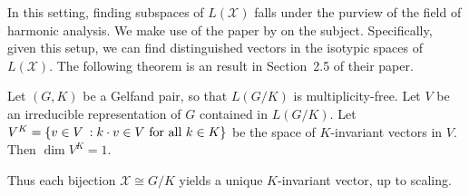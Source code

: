 \documentclass[cclicense]{hmcthesis}
\providecommand*{\xs}{\mathcal X}
\newcommand*{\STB}{\::}
\numberwithin{equation}{chapter}
\numberwithin{thmcounter}{chapter}
\begin{document}
    In this setting, finding subspaces of $L(\xs)$ falls under the purview of
    the field of harmonic analysis.  We make use of the paper by \citet{Harm} on
    the subject.  Specifically, given this setup, we can find distinguished
    vectors in the isotypic spaces of $L(\xs)$.  The following theorem is an
    result in Section~2.5 of their paper.
    \begin{theorem}
        Let $(G, K)$ be a Gelfand pair, so that $L(G/K)$ is multiplicity-free.
        Let $V$ be an irreducible representation of $G$ contained in $L(G/K)$.
        Let $V^K = \cdel*{v \in V \STB k \cdot v \in V \text{ for all $k \in
        K$}}$ be the space of $K$-invariant vectors in $V$.  Then $\dim V^K =
        1$.
    \end{theorem}
    \noindent Thus each bijection $\xs \cong G / K$ yields a unique
    $K$-invariant vector, up to scaling.
\end{document}
